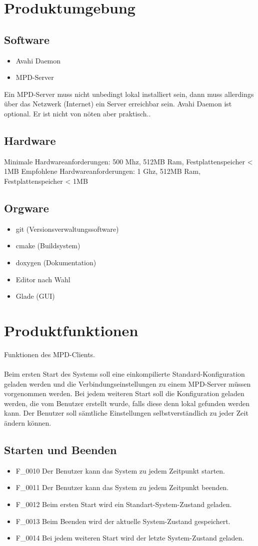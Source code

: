 \section{Produktumgebung}
\subsection{Software}
\begin{itemize}
	\item Avahi Daemon
	\item MPD-Server
\end{itemize}
Ein MPD-Server muss nicht unbedingt lokal installiert sein, dann muss 
allerdings über das Netzwerk (Internet) ein Server erreichbar sein.
Avahi Daemon ist optional. Er ist nicht von nöten aber praktisch..
\subsection{Hardware}
Minimale Hardwareanforderungen: 500 Mhz, 512MB Ram, Festplattenspeicher < 1MB
Empfohlene Hardwareanforderungen: 1 Ghz, 512MB Ram, Festplattenspeicher < 1MB
\subsection{Orgware}
\begin{itemize}
	\item git (Versionsverwaltungssoftware)
	\item cmake (Buildsystem)
	\item doxygen (Dokumentation)
	\item Editor nach Wahl
	\item Glade (GUI)
\end{itemize}
\section{Produktfunktionen}
Funktionen des MPD-Clients.\ \\ \\
Beim ersten Start des Systems soll eine einkompilierte Standard-Konfiguration geladen werden und die Verbindungseinstellungen
zu einem MPD-Server müssen vorgenommen werden. Bei jedem weiteren Start soll die Konfiguration geladen werden,
die vom Benutzer erstellt wurde, falls diese denn lokal gefunden werden kann. Der Benutzer soll sämtliche
Einstellungen selbstverständlich zu jeder Zeit ändern können.
\subsection{Starten und Beenden}
\begin{itemize}
	\item F\_0010 Der Benutzer kann das System zu jedem Zeitpunkt starten.
	\item F\_0011 Der Benutzer kann das System zu jedem Zeitpunkt beenden.
	\item F\_0012 Beim ersten Start wird ein Standart-System-Zustand geladen.
	\item F\_0013 Beim Beenden wird der aktuelle System-Zustand gespeichert.
	\item F\_0014 Bei jedem weiteren Start wird der letzte System-Zustand geladen.
\end{itemize}
